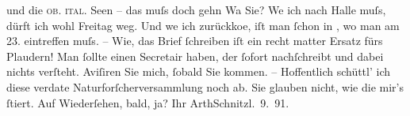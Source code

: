 \begin{ledgroupsized}[t]{13cm}
               und die \textsc{ob. ital.} Seen – das muſs doch gehn{\dotstwo} Wa{\geminationn}{ }\label{K_L02952-3v}\label{K_L02952-3h} Sie? We{\geminationn} ich nach Halle muſs, dürft ich wohl Freitag weg. Und
                  we{\geminationn} ich zurückko{\geminationm}e, iſt
                  {\pb}man ſchon in \label{K_L02952-4v}\label{K_L02952-4h}, wo man am 23. eintreffen muſs. – Wie, das
               Brief ſchreiben iſt ein recht matter Ersatz fürs Plaudern! Man ſollte einen Secretair
               haben, der ſofort nachſchreibt und dabei nichts verſteht. Aviſiren Sie mich, ſobald
               Sie kommen. – Hoffentlich schüttl’ ich diese verda{\geminationm}te
               Naturforſcherversammlung noch ab. Sie glauben nicht, wie die mir’s ſtiert.\pend
           \pstart
           {\pb}Auf Wiederſehen, bald, ja?\pend
           \pstart Ihr \spacefill\mbox{ArthSchnitzl}\pend{}. 9. 91.\pend
           
         
         \endnumbering{}\end{ledgroupsized}  \newcommand{\dateiname}{L02952}\newcommand{\titel}{Arthur Schnitzler an Felix Salten, 14. 9. 1891}\newcommand{\editorInnen}{Martin Anton Müller und Laura Untner}
      